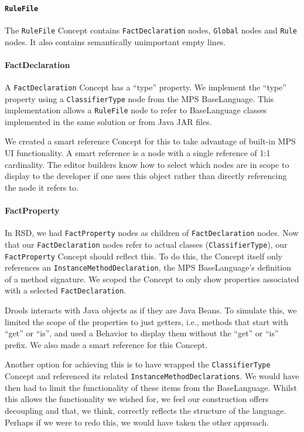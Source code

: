 \paragraph{\texttt{RuleFile}} The \texttt{RuleFile} Concept contains \texttt{FactDeclaration} nodes, \texttt{Global} nodes and \texttt{Rule} nodes.
It also contains semantically unimportant empty lines.

\paragraph{FactDeclaration} A \texttt{FactDeclaration} Concept has a ``type'' property.
We implement the ``type'' property using a \texttt{ClassifierType} node from the MPS BaseLanguage.
This implementation allows a \texttt{RuleFile} node to refer to BaseLanguage classes implemented in the same solution or from Java JAR files.

We created a smart reference Concept for this to take advantage of built-in MPS UI functionality.
A smart reference is a node with a single reference of 1:1 cardinality.
The editor builders know how to select which nodes are in scope to display to the developer if one uses this object rather than directly referencing the node it refers to.

\paragraph{FactProperty} In RSD, we had \texttt{FactProperty} nodes as children of \texttt{FactDeclaration} nodes.
Now that our \texttt{FactDeclaration} nodes refer to actual classes (\texttt{ClassifierType}), our \texttt{FactProperty} Concept should reflect this.
To do this, the Concept itself only references an \texttt{InstanceMethodDeclaration}, the MPS BaseLanguage's definition of a method signature.
We scoped the Concept to only show properties associated with a selected \texttt{FactDeclaration}.

Drools interacts with Java objects as if they are Java Beans.
To simulate this, we limited the scope of the properties to just getters, i.e., methods that start with ``get'' or ``is'', and used a Behavior to display them without the ``get'' or ``is'' prefix.
We also made a smart reference for this Concept.

Another option for achieving this is to have wrapped the \texttt{ClassifierType} Concept and referenced its related \texttt{InstanceMethodDeclarations}.
We would have then had to limit the functionality of these items from the BaseLanguage.
Whilst this allows the functionality we wished for, we feel our construction offers decoupling and that, we think, correctly reflects the structure of the language.
Perhaps if we were to redo this, we would have taken the other approach.

